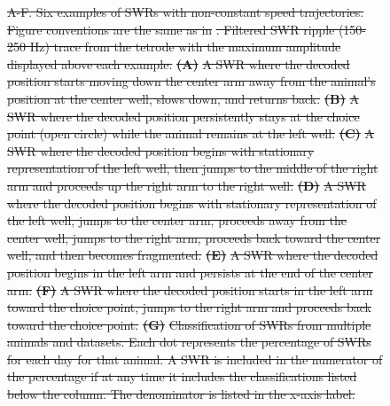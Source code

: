 \documentclass[9pt,lineno]{elife}
\providecommand{\DIFdel}[1]{{\protect\color{red}\sout{#1}}}                      %
\providecommand{\DIFdelbegin}{} %
\providecommand{\DIFdelFL}[1]{\DIFdel{#1}} %
\newcommand{\DIFscaledelfig}{0.5}
\newlength{\DIFdelgraphicswidth} %
\newlength{\DIFdelgraphicsheight} %
\newcommand{\DIFdelincludegraphics}[2][]{%
\sbox{\DIFdelgraphicsbox}{\DIFOincludegraphics[#1]{#2}}%
\settoboxwidth{\DIFdelgraphicswidth}{\DIFdelgraphicsbox} %
\settoboxtotalheight{\DIFdelgraphicsheight}{\DIFdelgraphicsbox} %
\scalebox{\DIFscaledelfig}{%
\parbox[b]{\DIFdelgraphicswidth}{\usebox{\DIFdelgraphicsbox}\\[-\baselineskip] \rule{\DIFdelgraphicswidth}{0em}}\llap{\resizebox{\DIFdelgraphicswidth}{\DIFdelgraphicsheight}{%
\setlength{\unitlength}{\DIFdelgraphicswidth}%
\begin{picture}(1,1)%
\thicklines\linethickness{2pt} %
{\color[rgb]{1,0,0}\put(0,0){\framebox(1,1){}}}%
{\color[rgb]{1,0,0}\put(0,0){\line( 1,1){1}}}%
{\color[rgb]{1,0,0}\put(0,1){\line(1,-1){1}}}%
\end{picture}%
}\hspace*{3pt}}} %
} %
\DeclareRobustCommand{\DIFdelbegin}{\DIFOdelbegin \let\includegraphics\DIFdelincludegraphics} %
\begin{document}
\begin{figure}
\DIFdelbegin %
{%
\DIFdelFL{A-F. Six examples of SWRs with non-constant speed trajectories. Figure conventions are the same as in }%
\DIFdelFL{. Filtered SWR ripple (150-250 Hz) trace from the tetrode with the maximum amplitude displayed above each example. }\textbf{\DIFdelFL{(A)}} %
\DIFdelFL{A SWR where the decoded position starts moving down the center arm away from the animal's position at the center well, slows down, and returns back. }\textbf{\DIFdelFL{(B)}} %
\DIFdelFL{A SWR where the decoded position persistently stays at the choice point (open circle) while the animal remains at the left well. }\textbf{\DIFdelFL{(C)}} %
\DIFdelFL{A SWR where the decoded position begins with stationary representation of the left well, then jumps to the middle of the right arm and proceeds up the right arm to the right well. }\textbf{\DIFdelFL{(D)}} %
\DIFdelFL{A SWR where the decoded position begins with stationary representation of the left well, jumps to the center arm, proceeds away from the center well, jumps to the right arm, proceeds back toward the center well, and then becomes fragmented. }\textbf{\DIFdelFL{(E)}} %
\DIFdelFL{A SWR where the decoded position begins in the left arm and persists at the end of the center arm. }\textbf{\DIFdelFL{(F)}} %
\DIFdelFL{A SWR where the decoded position starts in the left arm toward the choice point, jumps to the right arm and proceeds back toward the choice point. }\textbf{\DIFdelFL{(G)}} %
\DIFdelFL{Classification of SWRs from multiple animals and datasets. Each dot represents the percentage of SWRs for each day for that animal. A SWR is included in the numerator of the percentage if at any time it includes the classifications listed below the column. The denominator is listed in the x-axis label.
}}



\end{figure}
\end{document}
